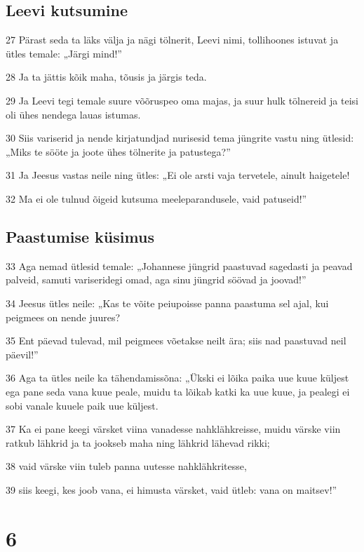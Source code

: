 \section*{Leevi kutsumine}

\par 27 Pärast seda ta läks välja ja nägi tölnerit, Leevi nimi, tollihoones istuvat ja ütles temale: „Järgi mind!”
\par 28 Ja ta jättis kõik maha, tõusis ja järgis teda.
\par 29 Ja Leevi tegi temale suure võõruspeo oma majas, ja suur hulk tölnereid ja teisi oli ühes nendega lauas istumas.
\par 30 Siis variserid ja nende kirjatundjad nurisesid tema jüngrite vastu ning ütlesid: „Miks te sööte ja joote ühes tölnerite ja patustega?”
\par 31 Ja Jeesus vastas neile ning ütles: „Ei ole arsti vaja tervetele, ainult haigetele!
\par 32 Ma ei ole tulnud õigeid kutsuma meeleparandusele, vaid patuseid!”

\section*{Paastumise küsimus}

\par 33 Aga nemad ütlesid temale: „Johannese jüngrid paastuvad sagedasti ja peavad palveid, samuti variseridegi omad, aga sinu jüngrid söövad ja joovad!”
\par 34 Jeesus ütles neile: „Kas te võite peiupoisse panna paastuma sel ajal, kui peigmees on nende juures?
\par 35 Ent päevad tulevad, mil peigmees võetakse neilt ära; siis nad paastuvad neil päevil!”
\par 36 Aga ta ütles neile ka tähendamissõna: „Ükski ei lõika paika uue kuue küljest ega pane seda vana kuue peale, muidu ta lõikab katki ka uue kuue, ja pealegi ei sobi vanale kuuele paik uue küljest.
\par 37 Ka ei pane keegi värsket viina vanadesse nahklähkreisse, muidu värske viin ratkub lähkrid ja ta jookseb maha ning lähkrid lähevad rikki;
\par 38 vaid värske viin tuleb panna uutesse nahklähkritesse,
\par 39 siis keegi, kes joob vana, ei himusta värsket, vaid ütleb: vana on maitsev!”


\chapter{6}

